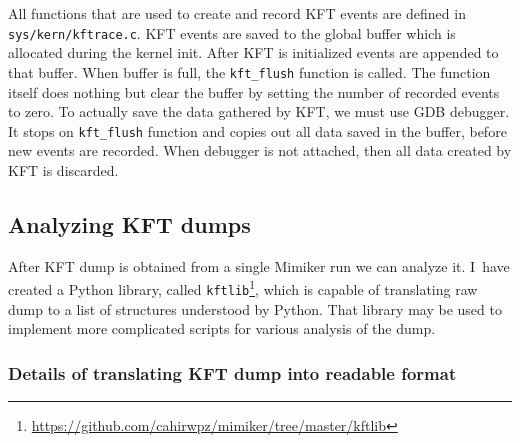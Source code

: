 All functions that are used to create and record KFT events are defined in \texttt{sys/kern/kftrace.c}.
KFT events are saved to the global buffer which is allocated during the kernel init.
After KFT is initialized events are appended to that buffer.
When buffer is full, the \texttt{kft_flush} function is called.
The function itself does nothing but clear the buffer by setting the number of recorded events to zero.
To actually save the data gathered by KFT, we must use GDB debugger.
It stops on \texttt{kft_flush} function and copies out all data saved in the buffer, before new events are recorded.
When debugger is not attached, then all data created by KFT is discarded.


\subsection{Analyzing KFT dumps}

After KFT dump is obtained from a single Mimiker run we can analyze it.
I~have created a Python library, called {\tt kftlib}\footnote{\url{https://github.com/cahirwpz/mimiker/tree/master/kftlib}},
which is capable of translating raw dump to a list of structures understood by Python.
That library may be used to implement more complicated scripts for various analysis of the dump.

\subsubsection{Details of translating KFT dump into readable format}

